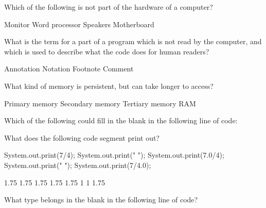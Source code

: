 \documentclass[answers,addpoints]{exam}
\begin{document}
\begin{questions}

\question[2] Which of the following is not part of the hardware of a computer?
\begin{choices}
    \choice Monitor
    \CorrectChoice Word processor
    \choice Speakers
    \choice Motherboard
\end{choices}

\question[2] What is the term for a part of a program which is not read by the computer, and which is used to describe what the code does for human readers?
\begin{choices}
    \choice Annotation
    \choice Notation
    \choice Footnote
    \CorrectChoice Comment
\end{choices}

\question[2] What kind of memory is persistent, but can take longer to access?
\begin{choices}
    \choice Primary memory
    \CorrectChoice Secondary memory
    \choice Tertiary memory
    \choice RAM
\end{choices}

\question[2] Which of the following could fill in the blank in the following line of code:
    \begin{center}
    \end{center}
\begin{choices}
    \choice {}
    \choice {}
    \CorrectChoice {}
    \choice {}
\end{choices}

\question[2] What does the following code segment print out?
\begin{code}
    System.out.print(7/4);
    System.out.print(" ");
    System.out.print(7.0/4);
    System.out.print(" ");
    System.out.print(7/4.0);
\end{code}
\begin{choices}
     1.75 1.75
     1.75 1.75
     1.75 1
     1 1.75
\end{choices}

\question[2] What type belongs in the blank in the following line of code?
\begin{center}
\end{center}
\begin{choices}
    \choice {}
    \choice {}
    \choice {}
    \CorrectChoice {}
\end{choices}


\end{questions}
\end{document}
